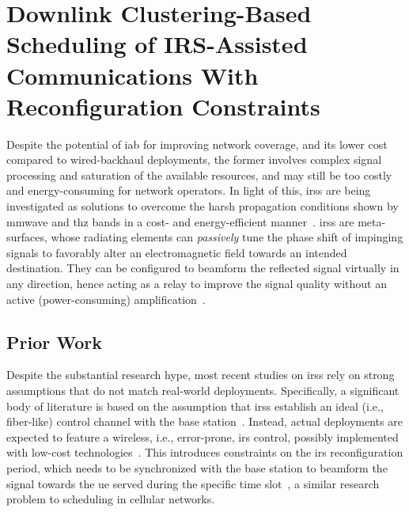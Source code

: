 
\chapter{Downlink Clustering-Based Scheduling of IRS-Assisted Communications With Reconfiguration Constraints}
\label{ch:irs-block}


Despite the potential of \gls{iab} for improving network coverage, and its lower cost compared to wired-backhaul deployments, the former involves complex signal processing and saturation of the available resources, and may still be too costly and energy-consuming for network operators.
In light of this, \glspl{irs} are being investigated as solutions to overcome the harsh propagation conditions shown by \gls{mmwave} and \gls{thz} bands in a cost- and energy-efficient manner~\cite{flamini2022towards}. 
\glspl{irs} are meta-surfaces, whose radiating elements can \emph{passively} tune the phase shift of impinging signals to favorably alter an electromagnetic field towards an intended destination. They can be configured to beamform the reflected signal virtually in any direction, hence acting as a relay to improve the signal quality without an active (power-consuming) amplification~\cite{bjornson2019intelligent}. 

\section{Prior Work}
Despite the substantial research hype, most recent studies on \glspl{irs} rely on strong assumptions that do not match real-world deployments.
Specifically, a significant body of literature is based on the assumption that \glspl{irs} establish an ideal (i.e., fiber-like) control channel with the base station~\cite{wu2020towards, abeywickrama2020intelligent, wu2019intelligent, pagin2022end}. Instead, actual deployments are expected to feature a wireless, i.e., error-prone, \gls{irs} control, possibly implemented with low-cost technologies~\cite{liu2022path, liaskos2018realizing}. 
This introduces constraints on the \gls{irs} reconfiguration period, which needs to be synchronized with the base station to beamform the signal towards the \gls{ue} served during the specific time slot~\cite{flamini2022towards}, a similar research problem to scheduling in cellular networks. 

